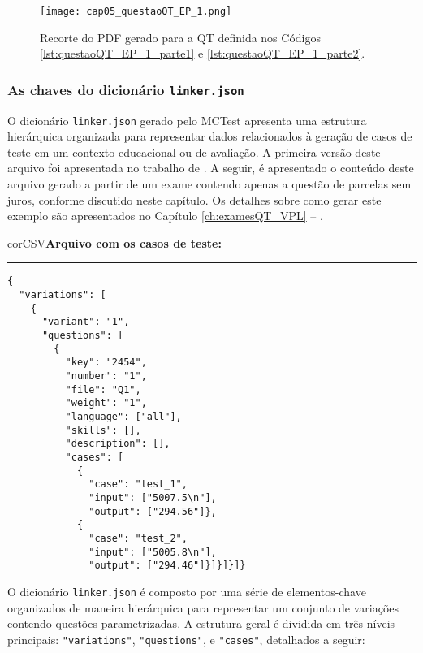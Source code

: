 \begin{figure}[!ht]
  \texttt{[image: cap05\_questaoQT\_EP\_1.png]}
  \caption{Recorte do PDF gerado para a QT definida nos Códigos \ref{lst:questaoQT_EP_1_parte1} e \ref{lst:questaoQT_EP_1_parte2}.}
  \label{fig:cap05_questaoQT_EP_1}
\end{figure}

\subsubsection{As chaves do dicionário \texttt{linker.json}} 


O dicionário \verb|linker.json| gerado pelo MCTest apresenta uma estrutura hierárquica organizada para representar dados relacionados à geração de casos de teste em um contexto educacional ou de avaliação. A primeira versão deste arquivo foi apresentada no trabalho de . A seguir, é apresentado o conteúdo deste arquivo gerado a partir de um exame contendo apenas a questão de parcelas sem juros, conforme discutido neste capítulo. Os detalhes sobre como gerar este exemplo são apresentados no Capítulo \ref{ch:examesQT_VPL} -- .

\begin{myboxCode}{corCSV}{\textbf{Arquivo com os casos de teste:}}\vspace{3mm}
    \hrule
    \begin{verbatim}
{
  "variations": [
    {
      "variant": "1",
      "questions": [
        {
          "key": "2454",
          "number": "1",
          "file": "Q1",
          "weight": "1",
          "language": ["all"],
          "skills": [],
          "description": [],
          "cases": [
            {
              "case": "test_1",
              "input": ["5007.5\n"],
              "output": ["294.56"]},
            {
              "case": "test_2",
              "input": ["5005.8\n"],
              "output": ["294.46"]}]}]}]}
\end{verbatim}
\end{myboxCode}


O dicionário \verb|linker.json| é composto por uma série de elementos-chave organizados de maneira hierárquica para representar um conjunto de variações contendo questões parametrizadas. A estrutura geral é dividida em três níveis principais: \verb|"variations"|, \verb|"questions"|, e \verb|"cases"|, detalhados a seguir:

